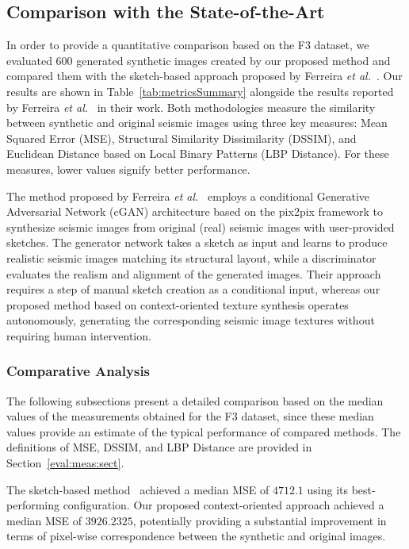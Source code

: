 \documentclass{ieeeaccess}
\begin{document}
\subsection{Comparison with the State-of-the-Art}

In order to provide a quantitative comparison based on the F3 dataset, we evaluated 600 generated synthetic images created by our proposed method and compared them with the sketch-based approach proposed by Ferreira \emph{et al.}~\cite{Ferreira2020}. Our results are shown in Table~\ref{tab:metricsSummary} alongside the results reported by Ferreira \emph{et al.}~\cite{Ferreira2020} in their work. Both methodologies measure the similarity between synthetic and original seismic images using three key measures: Mean Squared Error (MSE), Structural Similarity Dissimilarity (DSSIM), and Euclidean Distance based on Local Binary Patterns (LBP Distance). For these measures, lower values signify better performance.

The method proposed by Ferreira \emph{et al.}~\cite{Ferreira2020} employs a conditional Generative Adversarial Network (cGAN) architecture based on the pix2pix framework to synthesize seismic images from original (real) seismic images with user-provided sketches. The generator network takes a sketch as input and learns to produce realistic seismic images matching its structural layout, while a discriminator evaluates the realism and alignment of the generated images. Their approach requires a step of manual sketch creation as a conditional input, whereas our proposed method based on  context-oriented texture synthesis operates autonomously, generating the corresponding seismic image textures without requiring human intervention.


\subsubsection{Comparative Analysis}

The following subsections present a detailed comparison based on the median values of the measurements obtained for the F3 dataset, since these median values provide an estimate of the typical performance of compared methods. The  definitions of MSE, DSSIM, and LBP Distance are provided in Section~\ref{eval:meas:sect}.

The sketch-based method~\cite{Ferreira2020} achieved a median MSE of $4712.1$ using its best-performing configuration. Our proposed context-oriented approach achieved a median MSE of $3926.2325$, potentially providing  a substantial improvement in terms of pixel-wise correspondence between the synthetic and original images.
\end{document}
